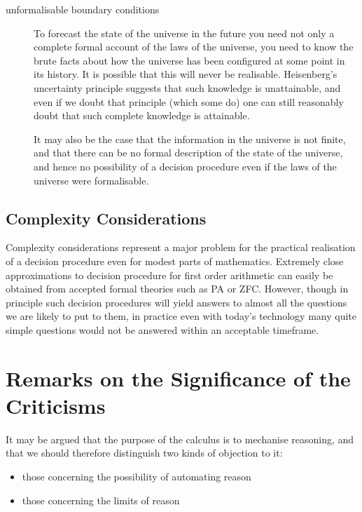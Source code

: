 \documentclass{rbjk}
\begin{document}
\begin{article}
\begin{description}
\item[unformalisable boundary conditions]

To forecast the state of the universe in the future you need not only a complete formal account of the laws of the universe, you need to know the brute facts about how the universe has been configured at some point in its history.
It is possible that this will never be realisable.
Heisenberg's uncertainty principle suggests that such knowledge is unattainable, and even if we doubt that principle (which some do) one can still reasonably doubt that such complete knowledge is attainable.

It may also be the case that the information in the universe is not finite, and that there can be no formal description of the state of the universe, and hence no possibility of a decision procedure even if the laws of the universe were formalisable.

\end{description}

\subsection{Complexity Considerations}

Complexity considerations represent a major problem for the practical realisation of a decision procedure even for modest parts of mathematics.
Extremely close approximations to decision procedure for first order arithmetic can easily be obtained from accepted formal theories such as PA or ZFC.
However, though in principle such decision procedures will yield answers to almost all the questions we are likely to put to them, in practice even with today's technology many quite simple questions would not be answered within an acceptable timeframe.

\section{Remarks on the Significance of the Criticisms}

It may be argued that the purpose of the calculus is to mechanise reasoning, and that we should therefore distinguish two kinds of objection to it:

\begin{itemize}
\item those concerning the possibility of automating reason
\item those concerning the limits of reason 
\end{itemize}


\end{article}
\end{document}
